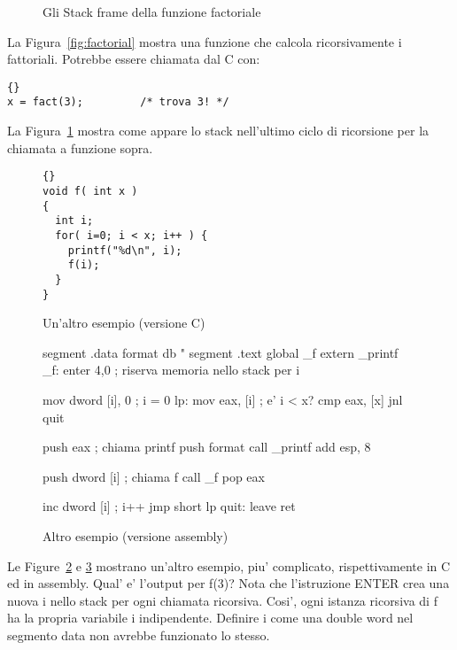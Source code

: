 \begin{figure}
\centering

\caption{Gli Stack frame della funzione factoriale\label{fig:factStack}}
\end{figure}

La Figura~\ref{fig:factorial} mostra una funzione che calcola ricorsivamente
i fattoriali. Potrebbe essere chiamata dal C con:
\begin{lstlisting}[stepnumber=0]{}
x = fact(3);         /* trova 3! */
\end{lstlisting}
La Figura~\ref{fig:factStack} mostra come appare lo stack nell'ultimo ciclo
di ricorsione per la chiamata a funzione sopra.

\begin{figure}[t]
\begin{lstlisting}[frame=tlrb]{}
void f( int x )
{
  int i;
  for( i=0; i < x; i++ ) {
    printf("%d\n", i);
    f(i);
  }
}
\end{lstlisting}
\caption{Un'altro esempio (versione C)\label{fig:rec2C}}
\end{figure}

\begin{figure}
\begin{AsmCodeListing}[frame=single]
segment .data
format       db "%
segment .text
      global _f
      extern _printf
_f:
      enter  4,0           ; riserva memoria nello stack per i

      mov    dword [i], 0  ; i = 0
lp:
      mov    eax, [i]      ; e' i < x?
      cmp    eax, [x]
      jnl    quit

      push   eax           ; chiama printf
      push   format
      call   _printf
      add    esp, 8

      push   dword [i]     ; chiama f
      call   _f
      pop    eax

      inc    dword [i]     ; i++
      jmp    short lp
quit:
      leave
      ret
\end{AsmCodeListing}
\caption{Altro esempio (versione assembly)\label{fig:rec2Asm}}
\end{figure}

Le Figure~\ref{fig:rec2C} e \ref{fig:rec2Asm} mostrano un'altro
esempio, piu' complicato, rispettivamente in C ed in assembly. Qual'
e' l'output per {\code f(3)}? Nota che l'istruzione {\code ENTER} 
crea una nuova {\code i} nello stack per ogni chiamata ricorsiva.
Cosi', ogni istanza ricorsiva di {\code f} ha la propria variabile
{\code i} indipendente. Definire {\code i} come una double word nel
segmento {\code data} non avrebbe funzionato lo stesso.

